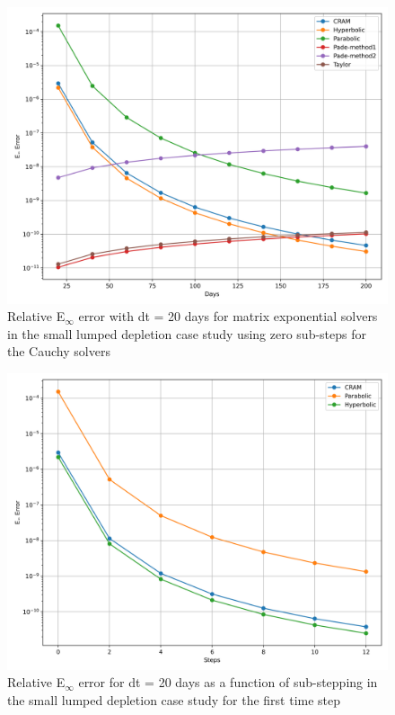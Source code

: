 \begin{figure}[p]
    \centering
    \includegraphics[width=5in]{images/chapter-5/caseStudies/smallLumpedDepletion/msrSmallLumpDepletionEinfErrorerrorSteps0.png}
    \caption{Relative E$_{\infty}$ error with dt = 20 days for matrix exponential solvers in the small lumped depletion case study using zero sub-steps for the Cauchy solvers}
    \label{fig:small_lumped_depletion_Einf_steps0}
\end{figure}

\clearpage

\begin{figure}[p]
    \centering
    \includegraphics[width=5in]{images/chapter-5/caseStudies/smallLumpedDepletion/msrSmallLumpedDepletionEinfErrorerrorWithSteps.png}
    \caption{Relative E$_{\infty}$ error for dt = 20 days as a function of sub-stepping in the small lumped depletion case study for the first time step}
    \label{fig:small_lumped_depletion_Einf_with_substeps}
\end{figure}

